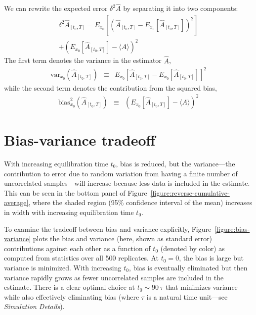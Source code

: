 \documentclass[aps,pre,twocolumn,nofootinbib,superscriptaddress,linenumbers,11point]{revtex4-1}
\newcommand{\expect}[1]{\langle #1 \rangle}                %
\begin{document}
We can rewrite the expected error $\delta^2 \hat{A}$ by separating it into two components:
\begin{eqnarray}
\delta^2 \hat{A}_{[t_0,T]} = E_{x_0}\left[ \left( \hat{A}_{[t_0,T]} - E_{x_0}[\hat{A}_{[t_0,T]}] \right)^2 \right] \nonumber \\
+ \left( E_{x_0}[\hat{A}_{[t_0,T]}] - \expect{A} \right)^2  \label{equation:bias-variance}  
\end{eqnarray}
The first term denotes the variance in the estimator $\hat{A}$,
\begin{eqnarray}
\mathrm{var}_{x_0} (\hat{A}_{[t_0,T]}) &\equiv& E_{x_0} \left[ \hat{A}_{[t_0,T]} - E_{x_0}[\hat{A}_{[t_0,T]}] \right]^2 \label{equation:variance}
\end{eqnarray}
while the second term denotes the contribution from the squared bias,
\begin{eqnarray}
\mathrm{bias}^2_{x_0} (\hat{A}_{[t_0,T]}) &\equiv& \left( E_{x_0}[\hat{A}_{[t_0,T]}] - \expect{A} \right)^2 \label{equation:variance}
\end{eqnarray}


\section*{Bias-variance tradeoff}

With increasing equilibration time $t_0$, bias is reduced, but the variance---the contribution to error due to random variation from having a finite number of uncorrelated samples---will increase because less data is included in the estimate.
This can be seen in the bottom panel of Figure~\ref{figure:reverse-cumulative-average}, where the shaded region (95\% confidence interval of the mean) increases in width with increasing equilibration time $t_0$.

To examine the tradeoff between bias and variance explicitly, Figure~\ref{figure:bias-variance} plots the bias and variance (here, shown as standard error) contributions against each other as a function of $t_0$ (denoted by color) as computed from statistics over all 500 replicates.
At $t_0 = 0$, the bias is large but variance is minimized.
With increasing $t_0$, bias is eventually eliminated but then variance rapidly grows as fewer uncorrelated samples are included in the estimate.
There is a clear optimal choice at $t_0 \sim 90~\tau$ that minimizes variance while also effectively eliminating bias (where $\tau$ is a natural time unit---see \emph{Simulation Details}).
\end{document}

